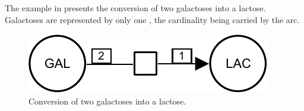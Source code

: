 The example in  presents the conversion of two galactoses into a lactose.  Galactoses are represented by only one , the cardinality being carried by the  arc.

\begin{figure}[H]
  \centering
  \includegraphics[scale = 0.8]{examples/process-dimerisation}
  \caption{Conversion of two galactoses into a lactose.}
  \label{fig:trans-dim}
\end{figure}

